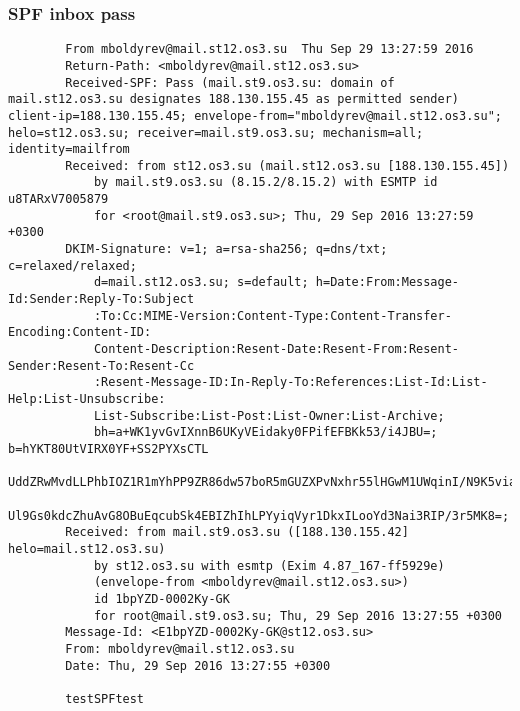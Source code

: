 \documentclass[10pt]{article}
\begin{document}
        \subsubsection*{SPF inbox pass}
        \begin{verbatim}
        From mboldyrev@mail.st12.os3.su  Thu Sep 29 13:27:59 2016
        Return-Path: <mboldyrev@mail.st12.os3.su>
        Received-SPF: Pass (mail.st9.os3.su: domain of mail.st12.os3.su designates 188.130.155.45 as permitted sender) client-ip=188.130.155.45; envelope-from="mboldyrev@mail.st12.os3.su"; helo=st12.os3.su; receiver=mail.st9.os3.su; mechanism=all; identity=mailfrom
        Received: from st12.os3.su (mail.st12.os3.su [188.130.155.45])
            by mail.st9.os3.su (8.15.2/8.15.2) with ESMTP id u8TARxV7005879
            for <root@mail.st9.os3.su>; Thu, 29 Sep 2016 13:27:59 +0300
        DKIM-Signature: v=1; a=rsa-sha256; q=dns/txt; c=relaxed/relaxed;
            d=mail.st12.os3.su; s=default; h=Date:From:Message-Id:Sender:Reply-To:Subject
            :To:Cc:MIME-Version:Content-Type:Content-Transfer-Encoding:Content-ID:
            Content-Description:Resent-Date:Resent-From:Resent-Sender:Resent-To:Resent-Cc
            :Resent-Message-ID:In-Reply-To:References:List-Id:List-Help:List-Unsubscribe:
            List-Subscribe:List-Post:List-Owner:List-Archive;
            bh=a+WK1yvGvIXnnB6UKyVEidaky0FPifEFBKk53/i4JBU=; b=hYKT80UtVIRX0YF+SS2PYXsCTL
            UddZRwMvdLLPhbIOZ1R1mYhPP9ZR86dw57boR5mGUZXPvNxhr55lHGwM1UWqinI/N9K5viaRIYT6u
            Ul9Gs0kdcZhuAvG8OBuEqcubSk4EBIZhIhLPYyiqVyr1DkxILooYd3Nai3RIP/3r5MK8=;
        Received: from mail.st9.os3.su ([188.130.155.42] helo=mail.st12.os3.su)
            by st12.os3.su with esmtp (Exim 4.87_167-ff5929e)
            (envelope-from <mboldyrev@mail.st12.os3.su>)
            id 1bpYZD-0002Ky-GK
            for root@mail.st9.os3.su; Thu, 29 Sep 2016 13:27:55 +0300
        Message-Id: <E1bpYZD-0002Ky-GK@st12.os3.su>
        From: mboldyrev@mail.st12.os3.su
        Date: Thu, 29 Sep 2016 13:27:55 +0300

        testSPFtest
        \end{verbatim}
\end{document}
